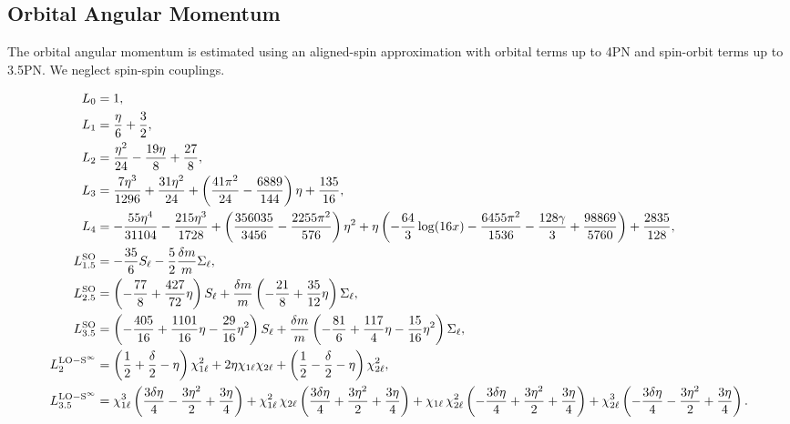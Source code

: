 \documentclass[%
aps,
prd,
amssymb,
amsmath,
amsfonts,
eqsecnum,
showpacs,
nofootinbib,
floatfix,
twocolumn,
twoside,
a4paper,
superscriptaddress
]{revtex4-1}
\begin{document}
\subsection{Orbital Angular Momentum}
The orbital angular momentum is estimated using an aligned-spin approximation with orbital terms up to 4PN and spin-orbit terms up to 3.5PN. We neglect spin-spin couplings. 
\label{app:orb_ang_mom}
\begin{widetext}
\begin{subequations}
\begin{align}
    L_0 &= 1, \\
    L_1 &= \frac{\eta }{6}+\frac{3}{2}, \\ 
    L_2 &= \frac{\eta ^2}{24}-\frac{19 \eta }{8}+\frac{27}{8}, \\ 
    L_3 &= \frac{7 \eta ^3}{1296}+\frac{31 \eta ^2}{24}+\left(\frac{41 \pi ^2}{24}-\frac{6889}{144}\right) \eta +\frac{135}{16}, \\ 
    L_4 &= -\frac{55 \eta ^4}{31104}-\frac{215 \eta ^3}{1728}+\left(\frac{356035}{3456}-\frac{2255 \pi ^2}{576}\right) \eta ^2+\eta
   \left(-\frac{64}{3} \log (16 x)-\frac{6455 \pi ^2}{1536}-\frac{128 \gamma
   }{3}+\frac{98869}{5760}\right)+\frac{2835}{128} , \\
   L_{1.5}^{\rm{SO}} &=  -\frac{35}{6} S_{\ell} - \frac{5}{2} \frac{\delta m}{m} \Sigma_{\ell}, \\
   L_{2.5}^{\rm{SO}} &= \left( -\frac{77}{8} + \frac{427}{72} \eta \right) S_{\ell} + \frac{\delta m}{m} \left( - \frac{21}{8} + \frac{35}{12} \eta  \right)  \Sigma_{\ell}, \\
   L_{3.5}^{\rm{SO}} &= \left( -\frac{405}{16} + \frac{1101}{16} \eta - \frac{29}{16} \eta^2 \right) S_{\ell} + \frac{\delta m}{m} \left( - \frac{81}{6} + \frac{117}{4} \eta - \frac{15}{16} \eta^2  \right)  \Sigma_{\ell}, \\
   L^{\rm{LO-}S^{\infty}}_{2} &= \left( \frac{1}{2} + \frac{\delta}{2} - \eta \right) \chi^2_{1\ell} + 2 \eta \chi_{1\ell} \chi_{2\ell} + \left( \frac{1}{2} - \frac{\delta}{2} - \eta \right) \chi^2_{2\ell} , \\
   L^{\rm{LO-}S^{\infty}}_{3.5} &= \chi_{1\ell}^3 \left(\frac{3 \delta  \eta }{4}-\frac{3 \eta ^2}{2}+\frac{3 \eta }{4}\right)+\chi_{1\ell}^2 \, \chi_{2\ell} \left(\frac{3 \delta  \eta
   }{4}+\frac{3 \eta ^2}{2}+\frac{3 \eta }{4}\right) + \chi_{1\ell} \, \chi_{2\ell}^2 \left(-\frac{3 \delta  \eta }{4}+\frac{3 \eta ^2}{2}+\frac{3
   \eta }{4}\right)+\chi_{2\ell}^3 \left(-\frac{3 \delta  \eta }{4}-\frac{3 \eta ^2}{2}+\frac{3 \eta }{4}\right) .
\end{align}
\end{subequations}
\end{widetext}
\end{document}
